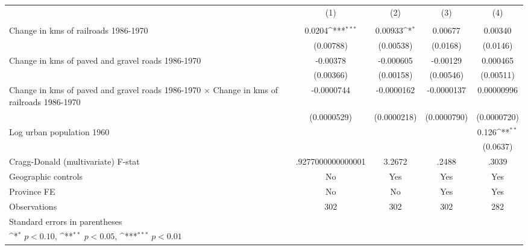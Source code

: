 {
\def\sym#1{\ifmmode^{#1}\else\(^{#1}\)\fi}
\begin{tabular}{l*{4}{c}}
\hline\hline
                &\multicolumn{1}{c}{(1)}&\multicolumn{1}{c}{(2)}&\multicolumn{1}{c}{(3)}&\multicolumn{1}{c}{(4)}\\
                &\multicolumn{1}{c}{}&\multicolumn{1}{c}{}&\multicolumn{1}{c}{}&\multicolumn{1}{c}{}\\
\hline
Change in kms of railroads 1986-1970&   0.0204\sym{***}&  0.00933\sym{*}  &  0.00677         &  0.00340         \\
                &(0.00788)         &(0.00538)         & (0.0168)         & (0.0146)         \\
[1em]
Change in kms of paved and gravel roads 1986-1970& -0.00378         &-0.000605         & -0.00129         & 0.000465         \\
                &(0.00366)         &(0.00158)         &(0.00546)         &(0.00511)         \\
[1em]
Change in kms of paved and gravel roads 1986-1970 $\times$ Change in kms of railroads 1986-1970&-0.0000744         &-0.0000162         &-0.0000137         &0.00000996         \\
                &(0.0000529)         &(0.0000218)         &(0.0000790)         &(0.0000720)         \\
[1em]
Log urban population 1960&                  &                  &                  &    0.126\sym{**} \\
                &                  &                  &                  & (0.0637)         \\
\hline
Cragg-Donald (multivariate) F-stat&.9277000000000001         &   3.2672         &    .2488         &    .3039         \\
Geographic controls&       No         &      Yes         &      Yes         &      Yes         \\
Province FE     &       No         &       No         &      Yes         &      Yes         \\
Observations    &      302         &      302         &      302         &      282         \\
\hline\hline
\multicolumn{5}{l}{\footnotesize Standard errors in parentheses}\\
\multicolumn{5}{l}{\footnotesize \sym{*} \(p<0.10\), \sym{**} \(p<0.05\), \sym{***} \(p<0.01\)}\\
\end{tabular}
}
